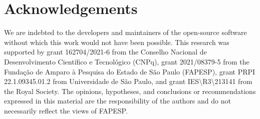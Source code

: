 \section{Acknowledgements}

We are indebted to the developers and maintainers of the open-source software
without which this work would not have been possible.
This research was supported by
grant 162704/2021-6 from the Conselho Nacional de Desenvolvimento Científico e Tecnológico (CNPq),
grant 2021/08379-5 from the Fundação de Amparo à Pesquisa do Estado de São Paulo (FAPESP),
grant PRPI 22.1.09345.01.2 from Universidade de São Paulo,
and grant IES\textbackslash{}R3\textbackslash{}213141 from the Royal Society.
The opinions, hypotheses, and conclusions or recommendations expressed in this
material are the responsibility of the authors and do not necessarily reflect
the views of FAPESP.
